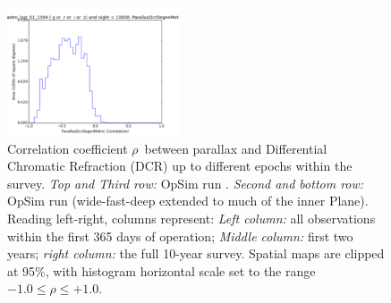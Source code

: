 \begin{figure}[ht]
\begin{center}
  \includegraphics[width=2.0in]{./figs/milkyway/astromPanels/MW_Astrom_paDcrDegen_wfdPlane_10y_hst.png}
  \end{center}
  \caption{Correlation coefficient $\rho$~between parallax and Differential Chromatic Refraction (DCR) up to different epochs within the survey. {\it Top and Third row:} OpSim run . {\it Second and bottom row:} OpSim run  (wide-fast-deep extended to much of the inner Plane). Reading left-right, columns represent: {\it Left column:} all observations within the first 365 days of operation; {\it Middle column:} first two years; {\it right column:} the full 10-year survey. Spatial maps are clipped at 95\%, with histogram horizontal scale set to the range $-1.0 \le \rho \le +1.0$.}
  \label{fig_astrom_ByTime_PADegen}
\end{figure}



